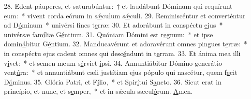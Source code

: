 28. Edent páuperes, et saturabúntur:~† et laudábunt Dóminum qui requírunt \uline{e}um:~* vivent corda eórum in s\uline{ǽ}culum s\uline{ǽ}culi.
29. Reminiscéntur et converténtur ad D\uline{ó}minum~* univérsi f\uline{i}nes t\uline{e}rræ:
30. Et adorábunt in conspéctu \uline{e}jus~* univérsæ fam\uline{í}liæ G\uline{é}ntium.
31. Quóniam Dómini est r\uline{e}gnum:~* et ipse domin\uline{á}bitur G\uline{é}ntium.
32. Manducavérunt et adoravérunt omnes pingues t\uline{e}rræ:~* in conspéctu ejus cadent omnes qui desc\uline{é}ndunt in t\uline{e}rram.
33. Et ánima mea illi v\uline{i}vet:~* et semen meum s\uline{é}rviet \uline{i}psi.
34. Annuntiábitur Dómino generátio vent\uline{ú}ra:~* et annuntiábunt cæli justítiam ejus pópulo qui nascétur, quem f\uline{e}cit D\uline{ó}minus.
35. Glória Patri, et F\uline{í}lio,~* et Spir\uline{í}tui S\uline{a}ncto.
36. Sicut erat in princípio, et nunc, et s\uline{e}mper,~* et in sǽcula sæcul\uline{ó}rum. \uline{A}men.
